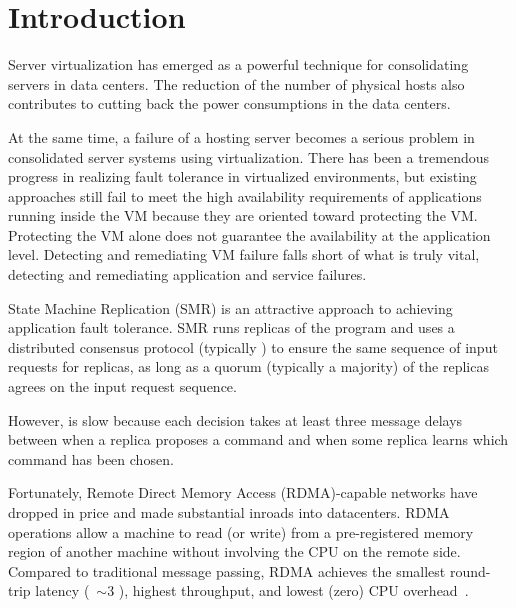 \section{Introduction} \label{sec:intro}


Server virtualization has emerged as a powerful technique for consolidating servers in 
data centers. The reduction of the number of physical hosts also contributes to cutting 
back the power consumptions in the data centers.


At the same time, a failure of a hosting server becomes a serious problem in consolidated 
server systems using virtualization. There has been a tremendous progress in realizing fault 
tolerance in virtualized environments, but existing approaches still fail to meet the high 
availability requirements of applications running inside the VM because they are oriented 
toward protecting the VM. Protecting the VM alone does not guarantee the availability at the 
application level. Detecting and remediating VM failure falls short of what is truly vital, 
detecting and remediating application and service failures.

State Machine Replication (SMR) is an attractive approach to achieving application fault tolerance. 
SMR runs replicas of the program and uses a distributed consensus protocol 
(typically \paxos) to ensure the same sequence of input requests for replicas, as long as a 
quorum (typically a majority) of the replicas agrees on the input request sequence.

However, \paxos is slow because each decision takes at least three message delays between when 
a replica proposes a command and when some replica learns which command has been chosen.

Fortunately, Remote Direct Memory Access (RDMA)-capable networks have dropped in price and made 
substantial inroads into datacenters. RDMA operations allow a machine to read (or write) from a 
pre-registered memory region of another machine without involving the CPU on the remote side. 
Compared to traditional message passing, RDMA achieves the smallest round-trip latency 
(~$\sim$3 \us), highest throughput, and lowest (zero) CPU overhead~\cite{pilaf:usenix14}.

